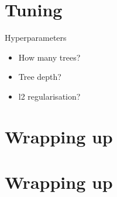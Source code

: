 \documentclass[obeyspaces,aspectratio=43]{beamer}
\providecommand{\tightlist}{%
  \setlength{\itemsep}{0pt}\setlength{\parskip}{0pt}}
\begin{document}
\section{Tuning}\label{tuning}

\begin{frame}{Hyperparameters}

\begin{itemize}
\tightlist
\item
  How many trees?
\item
  Tree depth?
\item
  l2 regularisation?
\end{itemize}

\end{frame}

\section{Wrapping up}\label{wrapping-up}

\section{Wrapping up}\label{wrapping-up-1}
\end{document}
